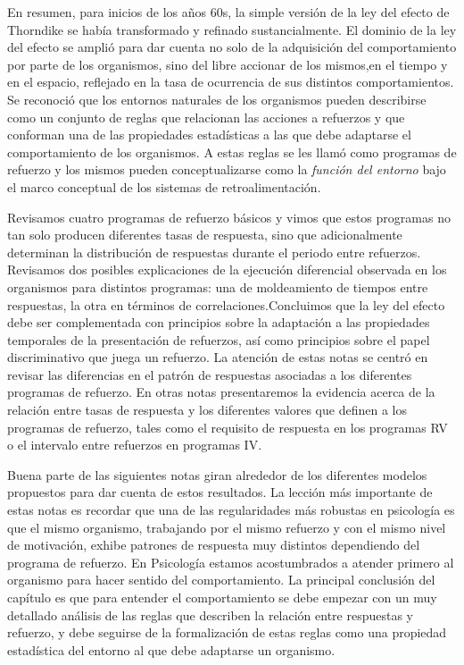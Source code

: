 \documentclass[
  letterpaper,
]{book}
\begin{document}
En resumen, para inicios de los años 60s, la simple versión de la ley
del efecto de Thorndike se había transformado y refinado
sustancialmente. El dominio de la ley del efecto se amplió para dar
cuenta no solo de la adquisición del comportamiento por parte de los
organismos, sino del libre accionar de los mismos,en el tiempo y en el
espacio, reflejado en la tasa de ocurrencia de sus distintos
comportamientos. Se reconoció que los entornos naturales de los
organismos pueden describirse como un conjunto de reglas que relacionan
las acciones a refuerzos y que conforman una de las propiedades
estadísticas a las que debe adaptarse el comportamiento de los
organismos. A estas reglas se les llamó como programas de refuerzo y los
mismos pueden conceptualizarse como la \emph{función del entorno} bajo
el marco conceptual de los sistemas de retroalimentación.

Revisamos cuatro programas de refuerzo básicos y vimos que estos
programas no tan solo producen diferentes tasas de respuesta, sino que
adicionalmente determinan la distribución de respuestas durante el
periodo entre refuerzos. Revisamos dos posibles explicaciones de la
ejecución diferencial observada en los organismos para distintos
programas: una de moldeamiento de tiempos entre respuestas, la otra en
términos de correlaciones.Concluimos que la ley del efecto debe ser
complementada con principios sobre la adaptación a las propiedades
temporales de la presentación de refuerzos, así como principios sobre el
papel discriminativo que juega un refuerzo. La atención de estas notas
se centró en revisar las diferencias en el patrón de respuestas
asociadas a los diferentes programas de refuerzo. En otras notas
presentaremos la evidencia acerca de la relación entre tasas de
respuesta y los diferentes valores que definen a los programas de
refuerzo, tales como el requisito de respuesta en los programas RV o el
intervalo entre refuerzos en programas IV.

Buena parte de las siguientes notas giran alrededor de los diferentes
modelos propuestos para dar cuenta de estos resultados. La lección más
importante de estas notas es recordar que una de las regularidades más
robustas en psicología es que el mismo organismo, trabajando por el
mismo refuerzo y con el mismo nivel de motivación, exhibe patrones de
respuesta muy distintos dependiendo del programa de refuerzo. En
Psicología estamos acostumbrados a atender primero al organismo para
hacer sentido del comportamiento. La principal conclusión del capítulo
es que para entender el comportamiento se debe empezar con un muy
detallado análisis de las reglas que describen la relación entre
respuestas y refuerzo, y debe seguirse de la formalización de estas
reglas como una propiedad estadística del entorno al que debe adaptarse
un organismo.
\end{document}
